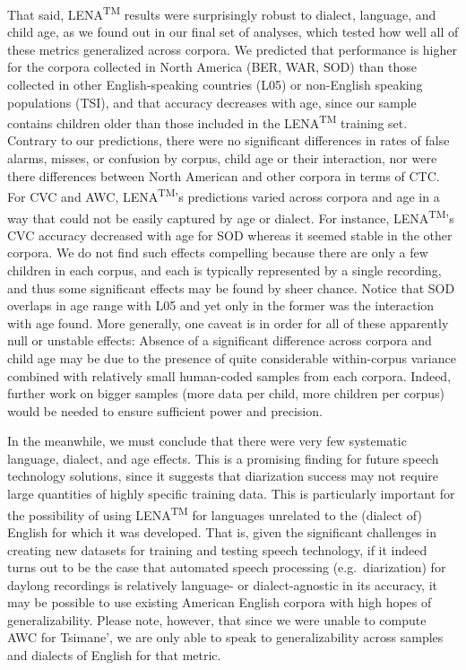\documentclass[english,floatsintext,man]{apa6}
\begin{document}
That said, LENA\textsuperscript{TM} results were surprisingly robust to
dialect, language, and child age, as we found out in our final set of
analyses, which tested how well all of these metrics generalized across
corpora. We predicted that performance is higher for the corpora
collected in North America (BER, WAR, SOD) than those collected in other
English-speaking countries (L05) or non-English speaking populations
(TSI), and that accuracy decreases with age, since our sample contains
children older than those included in the LENA\textsuperscript{TM}
training set. Contrary to our predictions, there were no significant
differences in rates of false alarms, misses, or confusion by corpus,
child age or their interaction, nor were there differences between North
American and other corpora in terms of CTC. For CVC and AWC,
LENA\textsuperscript{TM}'s predictions varied across corpora and age in
a way that could not be easily captured by age or dialect. For instance,
LENA\textsuperscript{TM}'s CVC accuracy decreased with age for SOD
whereas it seemed stable in the other corpora. We do not find such
effects compelling because there are only a few children in each corpus,
and each is typically represented by a single recording, and thus some
significant effects may be found by sheer chance. Notice that SOD
overlaps in age range with L05 and yet only in the former was the
interaction with age found. More generally, one caveat is in order for
all of these apparently null or unstable effects: Absence of a
significant difference across corpora and child age may be due to the
presence of quite considerable within-corpus variance combined with
relatively small human-coded samples from each corpora. Indeed, further
work on bigger samples (more data per child, more children per corpus)
would be needed to ensure sufficient power and precision.

In the meanwhile, we must conclude that there were very few systematic
language, dialect, and age effects. This is a promising finding for
future speech technology solutions, since it suggests that diarization
success may not require large quantities of highly specific training
data. This is particularly important for the possibility of using
LENA\textsuperscript{TM} for languages unrelated to the (dialect of)
English for which it was developed. That is, given the significant
challenges in creating new datasets for training and testing speech
technology, if it indeed turns out to be the case that automated speech
processing (e.g.~diarization) for daylong recordings is relatively
language- or dialect-agnostic in its accuracy, it may be possible to use
existing American English corpora with high hopes of generalizability.
Please note, however, that since we were unable to compute AWC for
Tsimane', we are only able to speak to generalizability across samples
and dialects of English for that metric.
\end{document}
